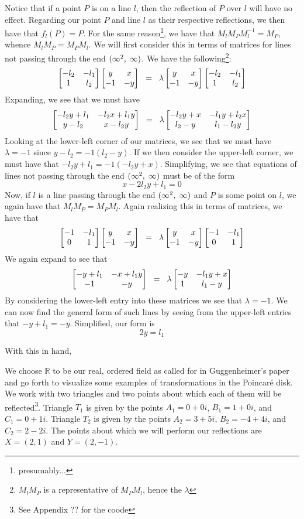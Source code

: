 \documentclass[12pt]{article}
\newcommand{\R}{\mathbb{R}}
\newcommand{\poincare}{Poincar\'{e} }
\newcommand{\inv}{^{-1}}
\newcommand{\spceq}{\hspace{2mm} = \hspace{2mm}}
\newcommand{\ttc}{, \hspace{1mm}}
\newcommand{\lftmat}[4]{\begin{bmatrix} {#1} & {#2} \\ {#3} & {#4} \end{bmatrix}}
\newcommand{\pointmat}[2]{\lftmat{{#2}}{{#1}}{-1}{-{#2}}}
\newcommand{\stanpointmat}{\pointmat{x}{y}}
\newcommand{\linenoendmat}[2]{\begin{bmatrix} -{#2} & -{#1} \\ 1 & {#2} \end{bmatrix}}
\newcommand{\stanlinenoendmat}{\linenoendmat{l_1}{l_2}}
\newcommand{\lineendmat}[2]{\begin{bmatrix} -1 & -{#1} \\ 0 & 1 \end{bmatrix}}
\newcommand{\stanlineendmat}{\lineendmat{l_1}{l_2}}
\newcommand{\specialend}{(\infty^2\ttc\infty)}
\theoremstyle{plain}
\theoremstyle{definition}
\begin{document}
Notice that if a point $P$ is on a line $l$, then the reflection of $P$ over $l$ will have no effect. Regarding our point $P$ and line $l$ as their respective reflections, we then have that $f_l(P) = P$. For the same reason\footnote{presumably...}, we have that $M_l M_P M_l\inv = M_P$, whence $M_l M_P = M_P M_l$. We will first consider this in terms of matrices for lines not passing through the end $\specialend$. We have the following\footnote{$M_l M_P$ is a representative of $M_P M_l$, hence the $\lambda$}:
\begin{equation} 
\stanlinenoendmat\stanpointmat \spceq \lambda \stanpointmat\stanlinenoendmat
\end{equation}	
Expanding, we see that we must have
	\[
		\lftmat{-l_2y+l_1}{-l_2x+l_1y}{y-l_2}{x-l_2y} \spceq \lambda \lftmat{-l_2y+x}{-l_1y+l_2x}{l_2-y}{l_1-l_2y}
	\]
Looking at the lower-left corner of our matrices, we see that we must have $\lambda = -1$ since $y - l_2 = -1(l_2 - y)$. If we then consider the upper-left corner, we must have that $-l_2y + l_1 = -1(-l_2y + x)$. Simplifying, we see that equations of lines not passing through the end $\specialend$ must be of the form
\begin{equation}
	x - 2l_2y + l_1  = 0
\end{equation} 
Now, if $l$ is a line passing through the end $\specialend$ and $P$ is some point on $l$, we again have that $M_l M_P = M_P M_l$. Again realizing this in terms of matrices, we have that 
\begin{equation} 
	\stanlineendmat\stanpointmat \spceq \lambda \stanpointmat\stanlineendmat
\end{equation}	
We again expand to see that 
	\[
		\lftmat{-y+l_1}{-x+l_1y}{-1}{-y} \spceq \lambda \lftmat{-y}{-l_1y+x}{1}{l_1-y}
	\]
By considering the lower-left entry into these matrices we see that $\lambda = -1$. We can now find the general form of such lines by seeing from the upper-left entries that $-y+l_1 = -y$. Simplified, our form is 
\begin{equation}
	2y = l_1
\end{equation} 

With this in hand, 






\newpage\wtftitle{Examples in $\R$}

We choose $\R$ to be our real, ordered field as called for in Guggenheimer's paper and go forth to visualize some examples of transformations in the \poincare disk. We work with two triangles and two points about which each of them will be reflected\footnote{See Appendix ?? for the coode}. Triangle $T_1$ is given by the points $A_1 = 0 + 0i$, $B_1 = 1 + 0i$, and $C_1 = 0 + 1i$. Triangle $T_2$ is given by the points $A_2 = 3 + 5i$, $B_2 = -4 + 4i$, and $C_2 = 2 - 2i$. The points about which we will perform our reflections are $X = (2, 1)$ and $Y = (2, -1)$.
\end{document}
